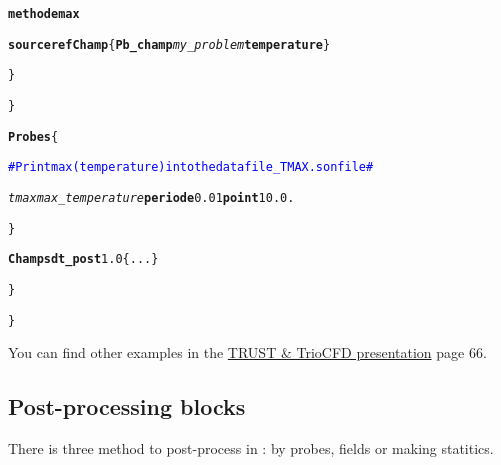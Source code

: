 \begin{itemize}
\begin{center}
{\begin{minipage}[c]{0.9\textwidth}
\begin{alltt}
\hspace{2cm}            {\bf{methode max}}

\hspace{2cm}            {\bf{source refChamp}} \{ {\bf{Pb\_champ}} \textit{my\_problem} {\bf{temperature}} \}

\hspace{1.5cm}            \}

\hspace{1cm}        \}

\hspace{1cm}        {\bf{Probes}} \{

\hspace{1.5cm}            \textcolor{blue}{\# Print max(temperature) into the datafile\_TMAX.son file \#}

\hspace{1.5cm}            \textit{tmax} \textit{max\_temperature} {\bf{periode}} 0.01 {\bf{point}} 1 0. 0.

\hspace{1cm}        \}

\hspace{1cm}        {\bf{Champs dt\_post}} 1.0 \{ ... \}

\hspace{0.5cm}        \}

\}
\end{alltt}
\end{minipage}}
\end{center}

You can find other examples in the \href{TRUST_and_TrioCFD_presentation.pdf}{TRUST \& TrioCFD presentation} page 66.



\end{itemize}





\subsection{Post-processing blocks}
There is three method to post-process in \trust: by probes, fields or making statitics.


